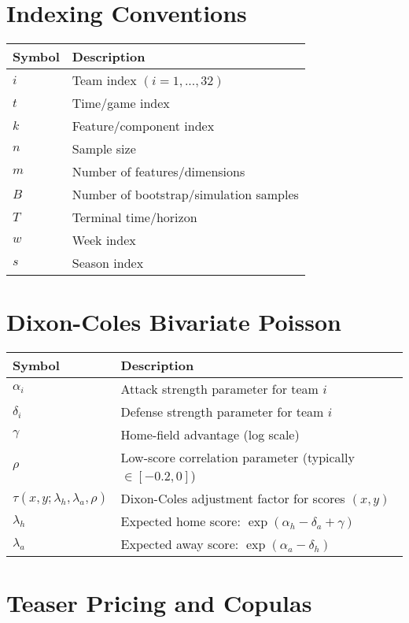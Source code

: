 \section*{Indexing Conventions}

\begin{tabular}{ll}
\toprule
\textbf{Symbol}  & \textbf{Description} \\
\midrule
$i$ & Team index $(i = 1, ..., 32)$ \\
$t$ & Time/game index \\
$k$ & Feature/component index \\
$n$ & Sample size \\
$m$ & Number of features/dimensions \\
$B$ & Number of bootstrap/simulation samples \\
$T$ & Terminal time/horizon \\
$w$ & Week index \\
$s$ & Season index \\
\bottomrule
\end{tabular}

\section*{Dixon-Coles Bivariate Poisson}

\begin{tabular}{ll}
\toprule
\textbf{Symbol}  & \textbf{Description} \\
\midrule
$\alpha_i$ & Attack strength parameter for team $i$ \\
$\delta_i$ & Defense strength parameter for team $i$ \\
$\gamma$ & Home-field advantage (log scale) \\
$\rho$ & Low-score correlation parameter (typically $\in [-0.2, 0]$) \\
$\tau(x,y;\lambda_h,\lambda_a,\rho)$ & Dixon-Coles adjustment factor for scores $(x,y)$ \\
$\lambda_h$ & Expected home score: $\exp(\alpha_h - \delta_a + \gamma)$ \\
$\lambda_a$ & Expected away score: $\exp(\alpha_a - \delta_h)$ \\
\bottomrule
\end{tabular}

\section*{Teaser Pricing and Copulas}

